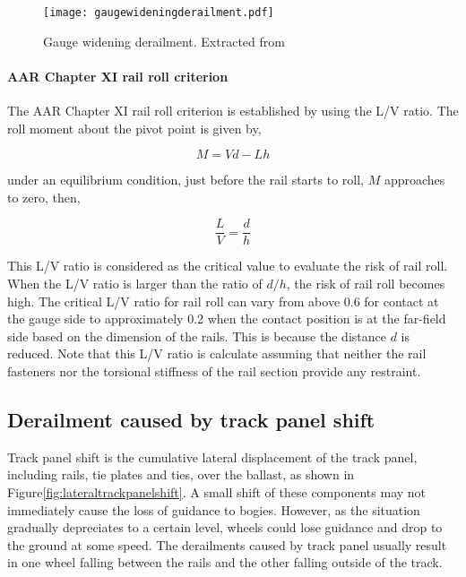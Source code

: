 \begin{figure}[h]
    \centering
    \texttt{[image: gaugewideningderailment.pdf]}
    \caption{Gauge widening derailment. Extracted from \citet[Figure8.18]{iwnicki2006handbook}}
    \label{fig:gaugewideningderailment}
\end{figure}

\paragraph{AAR Chapter XI rail roll criterion}
The AAR Chapter XI rail roll criterion is established by using the L/V ratio. The roll moment about the pivot point is given by,

\begin{equation}
    M=Vd-Lh
\end{equation}

under an equilibrium condition, just before the rail starts to roll, $M$ approaches to zero, then,

\begin{equation}
    \frac{L}{V}=\frac{d}{h}
\end{equation}

This L/V ratio is considered as the critical value to evaluate the risk of rail roll. When the L/V ratio is larger than the ratio of $d/h$, the risk of rail roll becomes high. The critical L/V ratio for rail roll can vary from above 0.6 for contact at the gauge side to approximately 0.2 when the contact position is at the far-field side based on the dimension of the rails. This is because the distance $d$ is reduced. Note that this L/V ratio is calculate assuming that neither the rail fasteners nor the torsional stiffness of the rail section provide any restraint.

\subsection{Derailment caused by track panel shift}
Track panel shift is the cumulative lateral displacement of the track panel, including rails, tie plates and ties, over the ballast, as shown in Figure\ref{fig:lateraltrackpanelshift}. A small shift of these components may not immediately cause the loss of guidance to bogies. However, as the situation gradually depreciates to a certain level, wheels could lose guidance and drop to the ground at some speed. The derailments caused by track panel usually result in one wheel falling between the rails and the other falling outside of the track.

